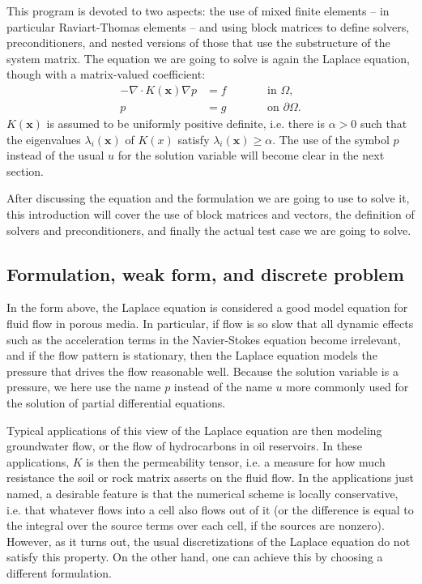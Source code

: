 \documentclass{article}
\renewcommand{\vec}[1]{\mathbf{#1}}
\begin{document}
This program is devoted to two aspects: the use of mixed finite elements -- in
particular Raviart-Thomas elements -- and using block matrices to define
solvers, preconditioners, and nested versions of those that use the
substructure of the system matrix. The equation we are going to solve is again
the Laplace equation, though with a matrix-valued coefficient:
\begin{align*}
  -\nabla \cdot K(\vec x) \nabla p &= f \qquad && \text{in $\Omega$}, \\
  p &= g && \text{on $\partial\Omega$}.
\end{align*}
$K(\vec x)$ is assumed to be uniformly positive definite, i.e. there is
$\alpha>0$ such that the eigenvalues $\lambda_i(\vec x)$ of $K(x)$ satisfy
$\lambda_i(\vec x)\ge \alpha$. The use of the symbol $p$ instead of the usual
$u$ for the solution variable will become clear in the next section.

After discussing the equation and the formulation we are going to use to solve
it, this introduction will cover the use of block matrices and vectors, the
definition of solvers and preconditioners, and finally the actual test case we
are going to solve.

\subsection*{Formulation, weak form, and discrete problem}

In the form above, the Laplace equation is considered a good model equation
for fluid flow in porous media. In particular, if flow is so slow that all
dynamic effects such as the acceleration terms in the Navier-Stokes equation
become irrelevant, and if the flow pattern is stationary, then the Laplace
equation models the pressure that drives the flow reasonable well. Because the
solution variable is a pressure, we here use the name $p$ instead of the
name $u$ more commonly used for the solution of partial differential equations.

Typical applications of this view of the Laplace equation are then modeling
groundwater flow, or the flow of hydrocarbons in oil reservoirs. In these
applications, $K$ is then the permeability tensor, i.e. a measure for how much
resistance the soil or rock matrix asserts on the fluid flow. In the
applications just named, a desirable feature is that the numerical scheme is
locally conservative, i.e. that whatever flows into a cell also flows out of
it (or the difference is equal to the integral over the source terms over each
cell, if the sources are nonzero). However, as it turns out, the usual
discretizations of the Laplace equation do not satisfy this property. On the
other hand, one can achieve this by choosing a different formulation.
\end{document}
